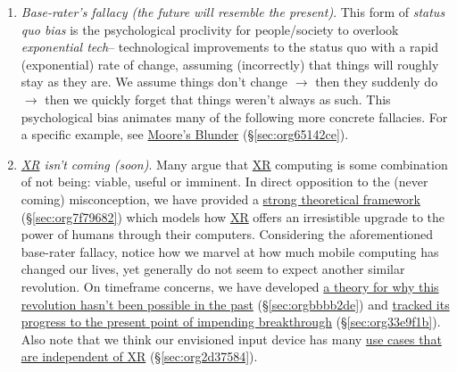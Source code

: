 \documentclass[logo,bsc,singlespacing,parskip]{infthesis}
\begin{document}
\begin{enumerate}
\item \emph{Base-rater's fallacy (the future will resemble the present)}.
This form of \emph{status quo bias} is the psychological proclivity for people/society to overlook \emph{exponential tech}-- technological improvements to the status quo with a rapid (exponential) rate of change, assuming (incorrectly) that things will roughly stay as they are.
We assume things don't change \(\rightarrow\) then they suddenly do \(\rightarrow\) then we quickly forget that things weren't always as such.
This psychological bias animates many of the following more concrete fallacies.
For a specific example, see \hyperref[sec:org65142ce]{Moore's Blunder} (\S \ref{sec:org65142ce}).

\item \emph{\hyperref[org39cbd51]{XR} isn't coming (soon)}.
Many argue that \hyperref[org39cbd51]{XR} computing is some combination of not being: viable, useful or imminent.
In direct opposition to the (never coming) misconception, we have provided a \hyperref[sec:org7f79682]{strong theoretical framework} (\S \ref{sec:org7f79682}) which models how \hyperref[org39cbd51]{XR} offers an irresistible upgrade to the power of humans through their computers.
Considering the aforementioned base-rater fallacy, notice how we marvel at how much mobile computing has changed our lives, yet generally do not seem to expect another similar revolution.
On timeframe concerns, we have developed \hyperref[sec:orgbbbb2de]{a theory for why this revolution hasn't been possible in the past} (\S \ref{sec:orgbbbb2de}) and \hyperref[sec:org33e9f1b]{tracked its progress to the present point of impending breakthrough} (\S \ref{sec:org33e9f1b}).
Also note that we think our envisioned input device has many \hyperref[sec:org2d37584]{use cases that are independent of XR} (\S \ref{sec:org2d37584}).


\end{enumerate}
\end{document}
